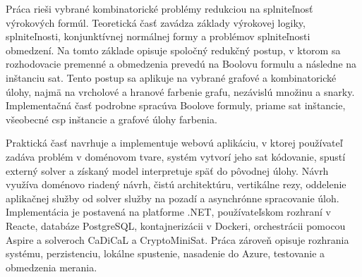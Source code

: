 Práca rieši vybrané kombinatorické problémy redukciou na splniteľnosť výrokových formúl. Teoretická časť zavádza základy výrokovej logiky, splniteľnosti, konjunktívnej normálnej formy a problémov splniteľnosti obmedzení. Na tomto základe opisuje spoločný redukčný postup, v ktorom sa rozhodovacie premenné a obmedzenia prevedú na Boolovu formulu a následne na inštanciu \acrshort{sat}. Tento postup sa aplikuje na vybrané grafové a kombinatorické úlohy, najmä na vrcholové a hranové farbenie grafu, nezávislú množinu a snarky. Implementačná časť podrobne spracúva Boolove formuly, priame \acrshort{sat} inštancie, všeobecné \acrshort{csp} inštancie a grafové úlohy farbenia.

Praktická časť navrhuje a implementuje webovú aplikáciu, v ktorej používateľ zadáva problém v doménovom tvare, systém vytvorí jeho \acrshort{sat} kódovanie, spustí externý solver a získaný model interpretuje späť do pôvodnej úlohy. Návrh využíva doménovo riadený návrh, čistú architektúru, vertikálne rezy, oddelenie aplikačnej služby od solver služby na pozadí a asynchrónne spracovanie úloh. Implementácia je postavená na platforme .NET, používateľskom rozhraní v Reacte, databáze PostgreSQL, kontajnerizácii v Dockeri, orchestrácii pomocou Aspire a solveroch CaDiCaL a CryptoMiniSat. Práca zároveň opisuje rozhrania systému, perzistenciu, lokálne spustenie, nasadenie do Azure, testovanie a obmedzenia merania.
